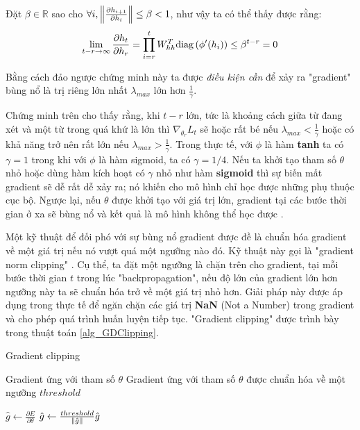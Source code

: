 Đặt $\beta \in \mathbb{R}$ sao cho $\forall i, \left\lVert\frac{\partial h_{i+1}}{\partial h_{i}}\right\rVert \leq \beta < 1$, như vậy ta có thể thấy được rằng:
\begin{equation} \label{gradientVanish3}
	\lim_{t - r \to \infty} \frac{\partial h_{t}}{\partial h_r} = \prod_{i=r}^{t} W_{hh}^T \mathrm{diag} \left(\phi'(h_i) \right) \leq \beta^{t - r} = 0
\end{equation}

Bằng cách đảo ngược chứng minh này ta được \textit{điều kiện cần} để xảy ra "gradient" bùng nổ là trị riêng lớn nhất $\lambda_{max}$ lớn hơn $\frac{1}{\gamma}$.

Chứng minh trên cho thấy rằng, khi $t-r$ lớn, tức là khoảng cách giữa từ đang xét và một từ trong quá khứ là lớn thì $\nabla_{\theta_r} L_t$ sẽ hoặc rất bé nếu $\lambda_{max} < \frac{1}{\gamma}$ hoặc có khả năng trở nên rất lớn nếu $\lambda_{max} > \frac{1}{\gamma}$. Trong thực tế, với $\phi$ là hàm \textbf{tanh} ta có $\gamma = 1$ trong khi với $\phi$ là hàm sigmoid, ta có $\gamma = 1/4$. Nếu ta khởi tạo tham số $\theta$ nhỏ hoặc dùng hàm kích hoạt có $\gamma$ nhỏ như hàm \textbf{sigmoid} thì sự biến mất gradient sẽ dễ rất dễ xảy ra; nó khiến cho mô hình chỉ học được những phụ thuộc cục bộ. Ngược lại, nếu $\theta$ được khởi tạo với giá trị lớn, gradient tại các bước thời gian ở xa sẽ bùng nổ và kết quả là mô hình không thể học được \cite{pascanu2011}.

Một kỹ thuật để đối phó với sự bùng nổ gradient được đề là chuẩn hóa gradient về một giá trị nếu nó vượt quá một ngưỡng nào đó. Kỹ thuật này gọi là "gradient norm clipping" \cite{pascanu2012}. Cụ thể, ta đặt một ngưỡng là chặn trên cho gradient, tại mỗi bước thời gian $t$ trong lúc "backpropagation", nếu độ lớn của gradient lớn hơn ngưỡng này ta sẽ chuẩn hóa trở về một giá trị nhỏ hơn. Giải pháp này được áp dụng trong thực tế để ngăn chặn các giá trị \textbf{NaN} (Not a Number) trong gradient và cho phép quá trình huấn luyện tiếp tục. "Gradient clipping" được trình bày trong thuật toán \ref{alg_GDClipping}.

\begin{algorithm}
	\caption{Gradient clipping}
	\label{alg_GDClipping}
	\begin{algorithmic}[1]
		\renewcommand{\algorithmicrequire}{\textbf{Đầu vào:}}
		\renewcommand{\algorithmicensure}{\textbf{Đầu ra:}}
		\algnewcommand{}
		\algnewcommand\Operation{\item[\algorithmicoperation]}
		
		\Require Gradient ứng với tham số $\theta$
		\Ensure Gradient ứng với tham số $\theta$ được chuẩn hóa về một ngưỡng $threshold$
		
		\Operation
		\State $\hat{g} \leftarrow \frac{\partial E}{\partial \theta}$
			\State $\hat{g} \leftarrow \frac{threshold}{\left\lVert\hat{g}\right\rVert} \hat{g}$
		\EndIf
	\end{algorithmic}
\end{algorithm}

